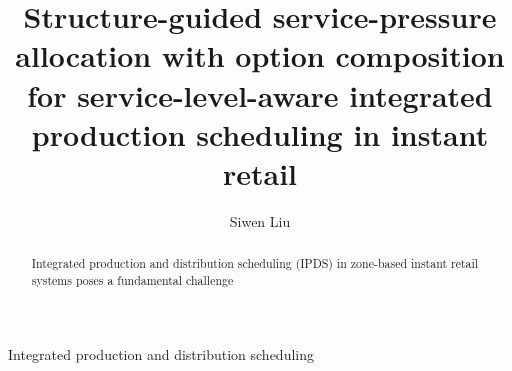 \documentclass[a4paper,fleqn]{cas-sc}
\begin{document}
\let\WriteBookmarks\relax
\def\floatpagepagefraction{1}
\def\textpagefraction{.001}

\shorttitle{}    


\title [mode = title]{Structure-guided service-pressure allocation with option composition for service-level-aware integrated production scheduling in instant retail}

%

\author[1]{Siwen Liu}%

\cormark[1]






\begin{abstract}
Integrated production and distribution scheduling (IPDS) in zone-based instant retail systems poses a fundamental challenge
\end{abstract}



\begin{keywords}
Integrated production and distribution scheduling 
\end{keywords}
\end{document}
